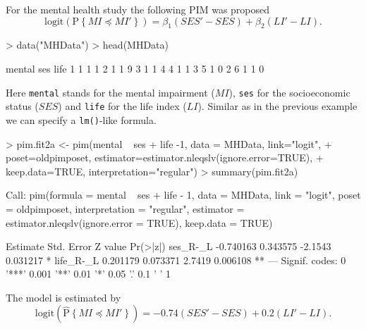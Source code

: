 \documentclass[12pt]{article}
\newcommand{\prob}[1]{\text{P}\left\{#1\right\}}
\newcommand{\hatprob}[1]{\hat{\text{P}}\left\{#1\right\}}
\newcommand{\leqs}{\preccurlyeq}
\begin{document}
For the mental health study the following PIM was proposed
\begin{equation}\label{pim.mhs}
\text{logit}\left(\prob{MI \leqs MI'} \right) = \beta_1 (SES' - SES) + \beta_2 (LI' - LI). 
\end{equation}
\begin{Schunk}
\begin{Sinput}
> data("MHData")
> head(MHData)
\end{Sinput}
\begin{Soutput}
  mental ses life
1      1   1    1
2      1   1    9
3      1   1    4
4      1   1    3
5      1   0    2
6      1   1    0
\end{Soutput}
\end{Schunk}
Here \verb|mental| stands for the mental impairment ($MI$), \verb|ses| for the socioeconomic status ($SES$) and \verb|life| for the life index ($LI$). Similar as in the previous example we can specify a \texttt{lm()}-like formula. 
\begin{Schunk}
\begin{Sinput}
> pim.fit2a <- pim(mental ~ ses + life -1, data = MHData, link="logit", 
+ 								 poset=oldpimposet, estimator=estimator.nleqslv(ignore.error=TRUE), 
+ 								 keep.data=TRUE, interpretation="regular")
> summary(pim.fit2a)
\end{Sinput}
\begin{Soutput}
Call:
pim(formula = mental ~ ses + life - 1, data = MHData, link = "logit", 
    poset = oldpimposet, interpretation = "regular", estimator = estimator.nleqslv(ignore.error = TRUE), 
    keep.data = TRUE)

           Estimate Std. Error Z value Pr(>|z|)   
ses_R-_L  -0.740163   0.343575 -2.1543 0.031217 * 
life_R-_L  0.201179   0.073371  2.7419 0.006108 **
---
Signif. codes:  0 '***' 0.001 '**' 0.01 '*' 0.05 '.' 0.1 ' ' 1 
\end{Soutput}
\end{Schunk}
The model is estimated by
\[
\text{logit}\left(\hatprob{MI \leqs MI'} \right) = -0.74 (SES' - SES) + 0.2 (LI' - LI). 
\]
\end{document}
